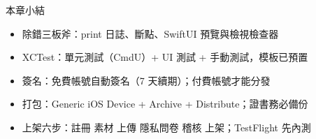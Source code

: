 \begin{tcbsummary}{本章小結}
\begin{itemize}
  \item 除錯三板斧：print 日誌、斷點、SwiftUI 預覽與檢視檢查器
  \item XCTest：單元測試（CmdU）+ UI 測試 + 手動測試，模板已預置
  \item 簽名：免費帳號自動簽名（7 天續期）；付費帳號才能分發
  \item 打包：Generic iOS Device + Archive + Distribute；證書務必備份
  \item 上架六步：註冊 素材 上傳 隱私問卷 稽核 上架；TestFlight 先內測
\end{itemize}

\end{tcbsummary}
